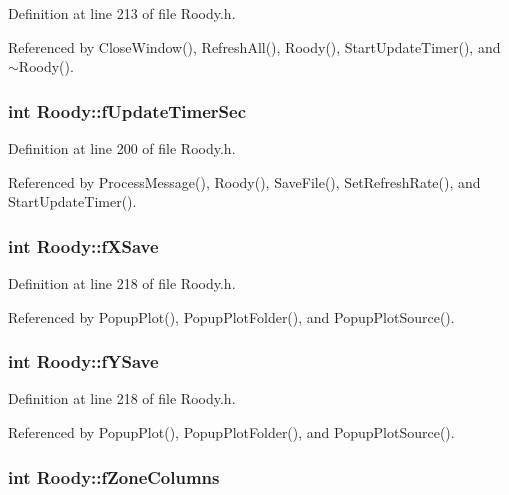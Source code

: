 Definition at line 213 of file Roody.h.

Referenced by CloseWindow(), RefreshAll(), Roody(), StartUpdateTimer(), and $\sim$Roody().
\subsubsection[{fUpdateTimerSec}]{\setlength{\rightskip}{0pt plus 5cm}int {\bf Roody::fUpdateTimerSec}\hspace{0.3cm}{\ttfamily  [private]}}\label{classRoody_acc9f0ce284066a96baff96bf9f0447ae}


Definition at line 200 of file Roody.h.

Referenced by ProcessMessage(), Roody(), SaveFile(), SetRefreshRate(), and StartUpdateTimer().
\subsubsection[{fXSave}]{\setlength{\rightskip}{0pt plus 5cm}int {\bf Roody::fXSave}\hspace{0.3cm}{\ttfamily  [private]}}\label{classRoody_a73898787ac0e2fa150fcad2d32b1251c}


Definition at line 218 of file Roody.h.

Referenced by PopupPlot(), PopupPlotFolder(), and PopupPlotSource().
\subsubsection[{fYSave}]{\setlength{\rightskip}{0pt plus 5cm}int {\bf Roody::fYSave}\hspace{0.3cm}{\ttfamily  [private]}}\label{classRoody_a186ab72676dda716ee613e7b79041feb}


Definition at line 218 of file Roody.h.

Referenced by PopupPlot(), PopupPlotFolder(), and PopupPlotSource().
\subsubsection[{fZoneColumns}]{\setlength{\rightskip}{0pt plus 5cm}int {\bf Roody::fZoneColumns}\hspace{0.3cm}{\ttfamily  [private]}}\label{classRoody_aa62435ee7709fcb4d9954a5873c09915}


